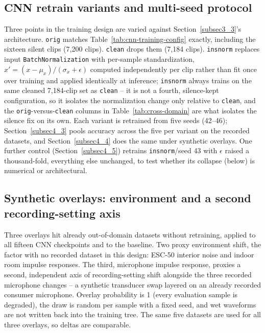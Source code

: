 \documentclass[pdflatex,sn-mathphys-num,iicol]{sn-jnl}
\theoremstyle{thmstyleone}
\theoremstyle{thmstyletwo}
\theoremstyle{thmstylethree}
\begin{document}
\subsection{CNN retrain variants and multi-seed protocol}\label{subsec3_variants}

Three points in the training design are varied against Section~\ref{subsec3_3}'s architecture. \texttt{orig} matches Table~\ref{tab:cnn-training-config} exactly, including the sixteen silent clips (7{,}200 clips). \texttt{clean} drops them (7{,}184 clips). \texttt{insnorm} replaces input \texttt{BatchNormalization} with per-sample standardization, $x' = (x-\mu_x)/(\sigma_x+\epsilon)$ computed independently per clip rather than fit once over training and applied identically at inference; \texttt{insnorm} always trains on the same cleaned 7{,}184-clip set as \texttt{clean} -- it is not a fourth, silence-kept configuration, so it isolates the normalization change only relative to \texttt{clean}, and the \texttt{orig}-versus-\texttt{clean} columns in Table~\ref{tab:cross-domain} are what isolates the silence fix on its own. Each variant is retrained from five seeds (42--46); Section~\ref{subsec4_3} pools accuracy across the five per variant on the recorded datasets, and Section~\ref{subsec4_4} does the same under synthetic overlays. One further control (Section~\ref{subsec4_5}) retrains \texttt{insnorm}/seed 43 with $\epsilon$ raised a thousand-fold, everything else unchanged, to test whether its collapse (below) is numerical or architectural.

\subsection{Synthetic overlays: environment and a second recording-setting axis}\label{subsec3_7}

Three overlays hit already out-of-domain datasets without retraining, applied to all fifteen CNN checkpoints and to the baseline. Two proxy environment shift, the factor with no recorded dataset in this design: ESC-50 interior noise and indoor room impulse responses. The third, microphone impulse response, proxies a second, independent axis of recording-setting shift alongside the three recorded microphone changes -- a synthetic transducer swap layered on an already recorded consumer microphone. Overlay probability is 1 (every evaluation sample is degraded), the draw is random per sample with a fixed seed, and wet waveforms are not written back into the training tree. The same five datasets are used for all three overlays, so deltas are comparable.
\end{document}
